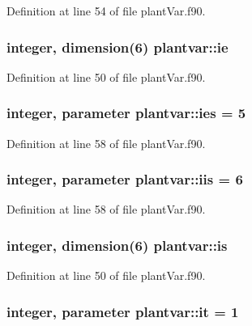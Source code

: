 Definition at line 54 of file plant\-Var.\-f90.

\hypertarget{classplantvar_ab30c259c0074e9d5499732c8d7090c66}{
\subsubsection[{ie}]{\setlength{\rightskip}{0pt plus 5cm}integer, dimension(6) plantvar\-::ie}}\label{classplantvar_ab30c259c0074e9d5499732c8d7090c66}


Definition at line 50 of file plant\-Var.\-f90.

\hypertarget{classplantvar_afd5b160dbbf007015da33b4011f36c83}{
\subsubsection[{ies}]{\setlength{\rightskip}{0pt plus 5cm}integer, parameter plantvar\-::ies = 5}}\label{classplantvar_afd5b160dbbf007015da33b4011f36c83}


Definition at line 58 of file plant\-Var.\-f90.

\hypertarget{classplantvar_a1c564e79e51182f3e016679d50615c49}{
\subsubsection[{iis}]{\setlength{\rightskip}{0pt plus 5cm}integer, parameter plantvar\-::iis = 6}}\label{classplantvar_a1c564e79e51182f3e016679d50615c49}


Definition at line 58 of file plant\-Var.\-f90.

\hypertarget{classplantvar_ac25b76f99d2e9c0b602a81c59e5bdc03}{
\subsubsection[{is}]{\setlength{\rightskip}{0pt plus 5cm}integer, dimension(6) plantvar\-::is}}\label{classplantvar_ac25b76f99d2e9c0b602a81c59e5bdc03}


Definition at line 50 of file plant\-Var.\-f90.

\hypertarget{classplantvar_ae20b71682087261a45478790df439eb9}{
\subsubsection[{it}]{\setlength{\rightskip}{0pt plus 5cm}integer, parameter plantvar\-::it = 1}}\label{classplantvar_ae20b71682087261a45478790df439eb9}


